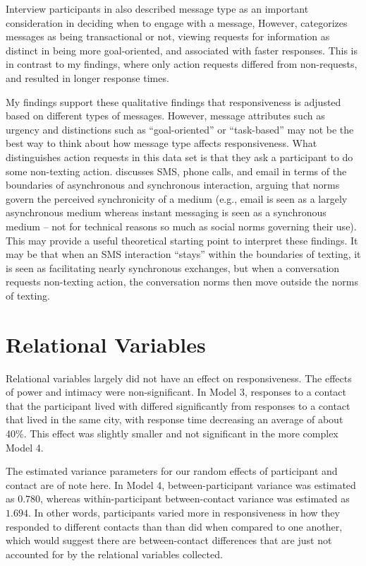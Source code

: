 \documentclass[12pt]{nuthesis}	%
\begin{document}
Interview participants in \citet{cui2016beyond} also described message type as an important consideration in deciding when to engage with a message, However, \citet{cui2016beyond} categorizes messages as being transactional or not, viewing requests for information as distinct in being more goal-oriented, and associated with faster responses. This is in contrast to my findings, where only action requests differed from non-requests, and resulted in longer response times.

My findings support these qualitative findings that responsiveness is adjusted based on different types of messages. However, message attributes such as urgency and distinctions such as ``goal-oriented'' or ``task-based'' may not be the best way to think about how message type affects responsiveness. What distinguishes action requests in this data set is that they ask a participant to do some non-texting action. \citet{rettie2009mobile} discusses SMS, phone calls, and email in terms of the boundaries of asynchronous and synchronous interaction, arguing that norms govern the perceived synchronicity of a medium (e.g., email is seen as a largely asynchronous medium whereas instant messaging is seen as a synchronous medium -- not for technical reasons so much as social norms governing their use). This may provide a useful theoretical starting point to interpret these findings. It may be that when an SMS interaction ``stays'' within the boundaries of texting, it is seen as facilitating nearly synchronous exchanges, but when a conversation requests non-texting action, the conversation norms then move outside the norms of texting.

\section{Relational Variables}

Relational variables largely did not have an effect on responsiveness. The effects of power and intimacy were non-significant. In Model 3, responses to a contact that the participant lived with differed significantly from responses to a contact that lived in the same city, with response time decreasing an average of about 40\%. This effect was slightly smaller and not significant in the more complex Model 4.

The estimated variance parameters for our random effects of participant and contact are of note here. In Model 4, between-participant variance was estimated as $0.780$, whereas within-participant between-contact variance was estimated as $1.694$. In other words, participants varied more in responsiveness in how they responded to different contacts than than did when compared to one another, which would suggest there are between-contact differences that are just not accounted for by the relational variables collected.
\end{document}
